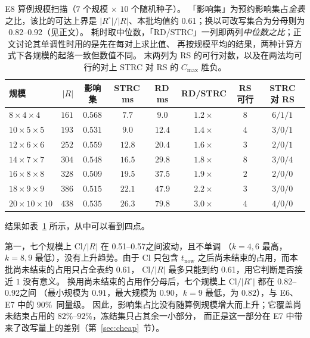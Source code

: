 \documentclass[manuscript,screen,review]{acmart}
\providecommand{\STRC}{\textsc{STRC}}
\newcommand{\NSeeds}{10}
\newcommand{\ClosureAliveFrac}{90\%}
\newcommand{\ScaleKs}{7}
\newcommand{\ScaleCloLo}{0.51}  %
\newcommand{\ScaleCloHi}{0.57}  %
\newcommand{\ScaleAliveShare}{0.61}  %
\newcommand{\ScaleCloAliveLo}{0.82}  %
\newcommand{\ScaleCloAliveHi}{0.92}  %
\begin{document}
\begin{table}[t]
\centering
\caption{E8 算例规模扫描（\(\ScaleKs\) 个规模 \(\times\) \(\NSeeds\) 个随机种子）。
「影响集」为预约影响集占\emph{全表}之比，该比的可达上界是 \(|R^{\circ}|/|R|\)、本批均值约
\ScaleAliveShare；换以可改写集合为分母则为 \ScaleCloAliveLo--\ScaleCloAliveHi（见正文）。
耗时取中位数，「RD/\STRC{}」一列即两列\emph{中位数之比}；正文讨论其单调性时用的是先在每对上求比值、
再按规模平均的结果，两种计算方式下各规模的起落一致但数值不同。
末两列为 RS 的可行对数，以及在两法均可行的对上 \STRC{} 对 RS 的 \(C_{\max}\) 胜负。}
\label{tab:instscale}
\small
\begin{tabular}{@{}lrcccccc@{}}
\toprule
规模 & \(|R|\) & 影响集 & \STRC{}\,ms & RD\,ms & RD/\STRC{} & RS 可行 & \STRC{} 对 RS \\
\midrule
\(8\times4\times4\)    & \(161\) & \(0.568\) & \(7.7\)  & \(9.0\)  & \(1.2\times\) & \(8\) & \(6/1/1\) \\
\(10\times5\times5\)   & \(193\) & \(0.531\) & \(9.0\)  & \(12.4\) & \(1.4\times\) & \(4\) & \(3/0/1\) \\
\(12\times6\times6\)   & \(252\) & \(0.559\) & \(12.8\) & \(20.4\) & \(1.6\times\) & \(3\) & \(2/0/1\) \\
\(14\times7\times7\)   & \(304\) & \(0.548\) & \(16.5\) & \(29.8\) & \(1.8\times\) & \(8\) & \(3/0/4\) \\
\(16\times8\times8\)   & \(328\) & \(0.509\) & \(19.5\) & \(37.5\) & \(1.9\times\) & \(2\) & \(2/0/0\) \\
\(18\times9\times9\)   & \(386\) & \(0.515\) & \(22.1\) & \(47.9\) & \(2.2\times\) & \(3\) & \(3/0/0\) \\
\(20\times10\times10\) & \(438\) & \(0.535\) & \(26.3\) & \(79.8\) & \(3.0\times\) & \(4\) & \(4/0/0\) \\
\bottomrule
\end{tabular}
\end{table}

结果如表~\ref{tab:instscale} 所示，从中可以看到四点。

第一，七个规模上 \(\mathrm{Cl}/|R|\) 在 \ScaleCloLo--\ScaleCloHi 之间波动，且不单调
（\(k=4,6\) 最高，\(k=8,9\) 最低），没有上升趋势。由于 \(\mathrm{Cl}\) 只包含
\(t_{\mathrm{now}}\) 之后尚未结束的占用，而本批尚未结束的占用只占全表约 \ScaleAliveShare，
\(\mathrm{Cl}/|R|\) 最多只能到约 \ScaleAliveShare，用它判断是否接近 \(1\) 没有意义。
换用尚未结束的占用作分母后，七个规模上 \(\mathrm{Cl}/|R^{\circ}|\) 都在 \ScaleCloAliveLo--\ScaleCloAliveHi 之间
（最小规模为 \(0.91\)，最大规模为 \(0.90\)，\(k=9\) 最低，为 \(0.82\)），与 E6、E7 中的 \ClosureAliveFrac\ 同量级。
因此，影响集占比没有随算例规模增大而上升；它覆盖尚未结束占用的 \(82\%\)--\(92\%\)，冻结集只占其余一小部分，
而正是这一部分在 E7 中带来了改写量上的差别（第~\ref{sec:cheap}~节）。
\end{document}
